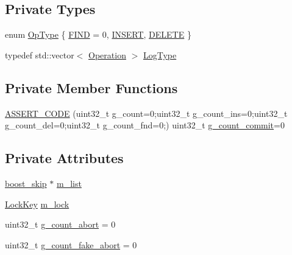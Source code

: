 \subsection*{Private Types}
\begin{DoxyCompactItemize}
\item 
enum \hyperlink{classBoostingSkip_a94ac47696f600bb1e667324e51ba2d18}{Op\-Type} \{ \hyperlink{classBoostingSkip_a94ac47696f600bb1e667324e51ba2d18a3592c4ffeee59af5e99a529f2a0df6c4}{F\-I\-N\-D} = 0, 
\hyperlink{classBoostingSkip_a94ac47696f600bb1e667324e51ba2d18a5e3ffae31e178cc970f9d93a81db79ec}{I\-N\-S\-E\-R\-T}, 
\hyperlink{classBoostingSkip_a94ac47696f600bb1e667324e51ba2d18aa750f9c5848395b0e1d5e44e3deee4ea}{D\-E\-L\-E\-T\-E}
 \}
\item 
typedef std\-::vector$<$ \hyperlink{structBoostingSkip_1_1Operation}{Operation} $>$ \hyperlink{classBoostingSkip_adde173207d30984e65e1d63fa25df19e}{Log\-Type}
\end{DoxyCompactItemize}
\subsection*{Private Member Functions}
\begin{DoxyCompactItemize}
\item 
\hyperlink{classBoostingSkip_a813ed469c437974f310cfacbe450717a}{A\-S\-S\-E\-R\-T\-\_\-\-C\-O\-D\-E} (uint32\-\_\-t g\-\_\-count=0;uint32\-\_\-t g\-\_\-count\-\_\-ins=0;uint32\-\_\-t g\-\_\-count\-\_\-del=0;uint32\-\_\-t g\-\_\-count\-\_\-fnd=0;) uint32\-\_\-t \hyperlink{transskip_8cc_a31e805bc19e3448a48adec9322bbb28a}{g\-\_\-count\-\_\-commit}=0
\end{DoxyCompactItemize}
\subsection*{Private Attributes}
\begin{DoxyCompactItemize}
\item 
\hyperlink{lockfreeskip_8c_a7b8979016b36903500570689693e2d6e}{boost\-\_\-skip} $\ast$ \hyperlink{classBoostingSkip_a900906c2e377dd0687acce9946c449db}{m\-\_\-list}
\item 
\hyperlink{classLockKey}{Lock\-Key} \hyperlink{classBoostingSkip_af69c8fcaf2f40ff82432e9d35f9dd28a}{m\-\_\-lock}
\item 
uint32\-\_\-t \hyperlink{classBoostingSkip_a17bca8f2a8c84c6c1b5e1ffba1c56aa9}{g\-\_\-count\-\_\-abort} = 0
\item 
uint32\-\_\-t \hyperlink{classBoostingSkip_a46890100a3061a09a075cbccf10b1e86}{g\-\_\-count\-\_\-fake\-\_\-abort} = 0
\end{DoxyCompactItemize}
